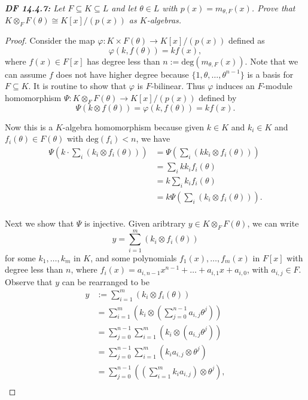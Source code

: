 \documentclass{article}
\begin{document}
\it \textbf{DF 14.4.7:} Let $F\subseteq K\subseteq L$ and let $\theta\in L$
  with $p(x)=m_{\theta,F}(x)$. Prove that $K\otimes_F F(\theta) \cong
  K[x]/(p(x))$ as $K$-algebras.

  \begin{proof}
    Consider the map $\varphi:K\times F(\theta) \rightarrow K[x]/(p(x))$
    defined as
    \[\varphi(k,f(\theta)) =kf(x),\]
    where $f(x)\in F[x]$ has degree less than
    $n:=\text{deg}(m_{\theta,F}(x))$. Note that we can assume $f$ does not
    have higher degree because $\{1,\theta,\ldots,\theta^{n-1}\}$ is a
    basis for $F\subseteq K$. It is routine to show that $\varphi$ is
    $F$-bilinear. Thus $\varphi$ induces an $F$-module homomorphism
    $\Psi:K\otimes_F F(\theta) \rightarrow K[x]/(p(x))$ defined by
    \[\Psi(k\otimes f(\theta)) =\varphi(k,f(\theta)) =kf(x).\]

    Now this is a $K$-algebra homomorphism because given $k\in K$ and
    $k_i\in K$ and $f_i(\theta)\in F(\theta)$ with $\text{deg}(f_i)<n$, we
    have
    \begin{align*}
      \Psi\left( k\cdot \sum_i (k_i\otimes f_i(\theta)) \right)
        &=\Psi\left( \sum_i (kk_i\otimes f_i(\theta)) \right) \\
      &=\sum_i kk_if_i(\theta) \\
      &=k\sum_i k_if_i(\theta) \\
      &=k\Psi\left( \sum_i (k_i\otimes f_i(\theta)) \right). \\
    \end{align*}

    Next we show that $\Psi$ is injective. Given aribtrary $y\in K\otimes_F
    F(\theta)$, we can write
    \[y= \sum_{i=1}^m (k_i\otimes f_i(\theta))\]
    for some $k_1,\ldots,k_m$ in $K$, and some polynomials
    $f_1(x),\ldots,f_m(x)$ in $F[x]$ with degree less than $n$, where
    $f_i(x)=a_{i,n-1}x^{n-1}+\ldots+a_{i,1}x+a_{i,0}$, with $a_{i,j}\in F$.
    Observe that $y$ can be rearranged to be
    \begin{align*}
      y &:=\sum_{i=1}^m (k_i\otimes f_i(\theta))\\
      &=\sum_{i=1}^m \left(k_i \otimes \left(\sum_{j=0}^{n-1}
        a_{i,j}\theta^j\right) \right)\\
      &=\sum_{j=0}^{n-1} \sum_{i=1}^m \left(k_i \otimes \left(
        a_{i,j}\theta^j\right) \right)\\
      &=\sum_{j=0}^{n-1} \sum_{i=1}^m (k_ia_{i,j} \otimes \theta^j)\\
      &=\sum_{j=0}^{n-1} \left(\left(\sum_{i=1}^m k_ia_{i,j}\right)
        \otimes \theta^j \right),\\
    \end{align*}


\end{proof}
\end{document}
